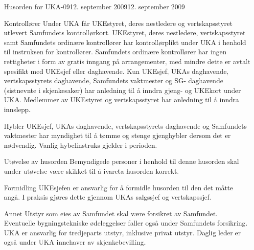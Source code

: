 \documentclass[../fsbok.tex]{subfiles}
\begin{document}
\begin{instruks}{Husorden for UKA-09}{12. september 2009}{12. september 2009}
\begin{instruksledd}{Kontrollører}
Under UKA får UKEstyret, deres nestledere og vertskapsstyret utlevert Samfundets
kontrollørkort. UKEstyret, deres nestledere, vertskapsstyret samt Samfundets ordinære
kontrollører har kontrollørplikt under UKA i henhold til instruksen for kontrollører.
Samfundets ordinære kontrollører har ingen rettigheter i form av gratis inngang på
arrangementer, med mindre dette er avtalt spesifikt med UKEsjef eller daghavende. Kun
UKEsjef, UKAs daghavende, vertskapsstyrets daghavende, Samfundets vaktmester og SG-
daghavende (sistnevnte i skjenkesaker) har anledning til å inndra gjeng- og UKEkort under
UKA. Medlemmer av UKEstyret og vertskapsstyret har anledning til å inndra innslepp.
\end{instruksledd}

\begin{instruksledd}{Hybler}
UKEsjef, UKAs daghavende, vertskapsstyrets daghavende og Samfundets vaktmester har
myndighet til å tømme og stenge gjenghybler dersom det er nødvendig. Vanlig hybelinstruks
gjelder i perioden.
\end{instruksledd}

\begin{instruksledd}{Utøvelse av husorden}
Bemyndigede personer i henhold til denne husorden skal under utøvelse være skikket til å
ivareta husorden korrekt.
\end{instruksledd}

\begin{instruksledd}{Formidling}
UKEsjefen er ansvarlig for å formidle husorden til den det måtte angå. I praksis gjøres dette
gjennom UKAs salgssjef og vertskapssjef.
\end{instruksledd}

\begin{instruksledd}{Annet}
Utstyr som eies av Samfundet skal være forsikret av Samfundet. Eventuelle bygningstekniske
ødeleggelser faller også under Samfundets forsikring. UKA er ansvarlig for tredjeparts utstyr,
inklusive privat utstyr. Daglig leder er også under UKA innehaver av skjenkebevilling.
\end{instruksledd}

\end{instruks}
\end{document}
